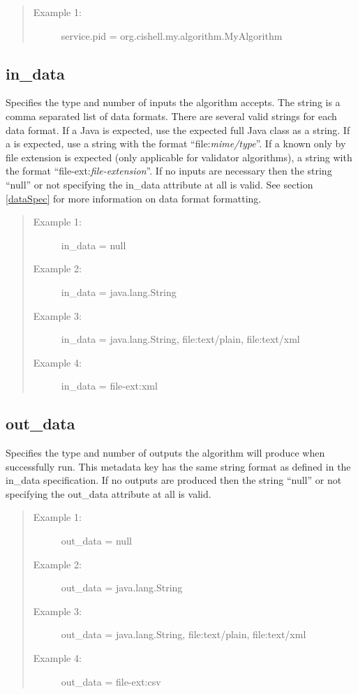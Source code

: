 \begin{quote}
\begin{description}
  \item[Example 1:] service.pid = org.cishell.my.algorithm.MyAlgorithm
\end{description}
\end{quote}

\subsection*{in\_data} Specifies the type and number of  inputs the
algorithm accepts. The string is a comma separated list of data formats. There
are several valid strings for each data format. If a Java  is
expected, use the expected full Java class as a string. If a 
is expected, use a string with the format ``file:\textit{mime/type}''. If a
 known only by file extension is expected (only applicable
for validator algorithms), a string with the format
``file-ext:\textit{file-extension}''. If no  inputs are necessary
then the string ``null'' or not specifying the in\_data attribute at all is
valid. See section \ref{dataSpec} for more information on data format formatting.

\begin{quote}
\begin{description}
  \item[Example 1:] in\_data = null
  \item[Example 2:] in\_data = java.lang.String
  \item[Example 3:] in\_data = java.lang.String, file:text/plain, file:text/xml
  \item[Example 4:] in\_data = file-ext:xml
\end{description}
\end{quote}


\subsection*{out\_data} 
Specifies the type and number of  outputs the
algorithm will produce when successfully run. This metadata key has the same
string format as defined in the in\_data specification. If no 
outputs are produced then the string ``null'' or not specifying the out\_data
attribute at all is valid.

\begin{quote}
\begin{description}
  \item[Example 1:] out\_data = null
  \item[Example 2:] out\_data = java.lang.String
  \item[Example 3:] out\_data = java.lang.String, file:text/plain, file:text/xml
  \item[Example 4:] out\_data = file-ext:csv
\end{description}
\end{quote}

